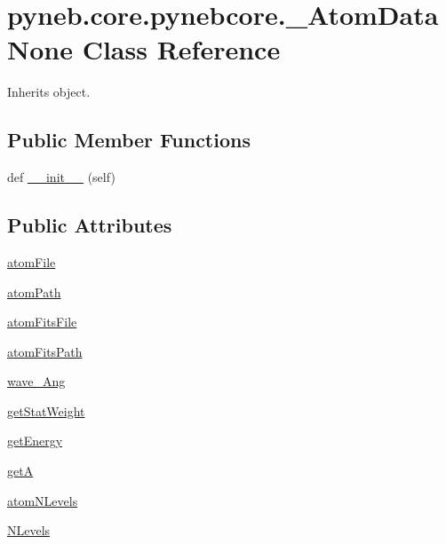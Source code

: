 \hypertarget{classpyneb_1_1core_1_1pynebcore_1_1___atom_data_none}{}\section{pyneb.\+core.\+pynebcore.\+\_\+\+Atom\+Data\+None Class Reference}
\label{classpyneb_1_1core_1_1pynebcore_1_1___atom_data_none}


Inherits object.

\subsection*{Public Member Functions}
\begin{DoxyCompactItemize}
\item 
def \hyperlink{classpyneb_1_1core_1_1pynebcore_1_1___atom_data_none_af3a42f81acbecee70f5e28ee47f90a7f}{\+\_\+\+\_\+init\+\_\+\+\_\+} (self)
\end{DoxyCompactItemize}
\subsection*{Public Attributes}
\begin{DoxyCompactItemize}
\item 
\hyperlink{classpyneb_1_1core_1_1pynebcore_1_1___atom_data_none_a0b4acd0c49278c6b3ac0fa460ad33bb9}{atom\+File}
\item 
\hyperlink{classpyneb_1_1core_1_1pynebcore_1_1___atom_data_none_aa255a7f490aa5d1cf7cfee7c5eb388ae}{atom\+Path}
\item 
\hyperlink{classpyneb_1_1core_1_1pynebcore_1_1___atom_data_none_af853b15fb8cb15c2781dedc2cac7f3a3}{atom\+Fits\+File}
\item 
\hyperlink{classpyneb_1_1core_1_1pynebcore_1_1___atom_data_none_ad9df42301b90127f83be1381a302f57b}{atom\+Fits\+Path}
\item 
\hyperlink{classpyneb_1_1core_1_1pynebcore_1_1___atom_data_none_a6a6e8b052741d46963b85c0cdcb9fd79}{wave\+\_\+\+Ang}
\item 
\hyperlink{classpyneb_1_1core_1_1pynebcore_1_1___atom_data_none_a45c07931f008fd0cfc0349222b14cd8c}{get\+Stat\+Weight}
\item 
\hyperlink{classpyneb_1_1core_1_1pynebcore_1_1___atom_data_none_ace59c545d211f79753ebdc9414eb1824}{get\+Energy}
\item 
\hyperlink{classpyneb_1_1core_1_1pynebcore_1_1___atom_data_none_a44aa15dc5314c07627944e86581631b1}{get\+A}
\item 
\hyperlink{classpyneb_1_1core_1_1pynebcore_1_1___atom_data_none_a3bc65b4742319ce5123d6fd3ca977c63}{atom\+N\+Levels}
\item 
\hyperlink{classpyneb_1_1core_1_1pynebcore_1_1___atom_data_none_a784a8906a9fd1b408b567989207aca84}{N\+Levels}
\end{DoxyCompactItemize}


